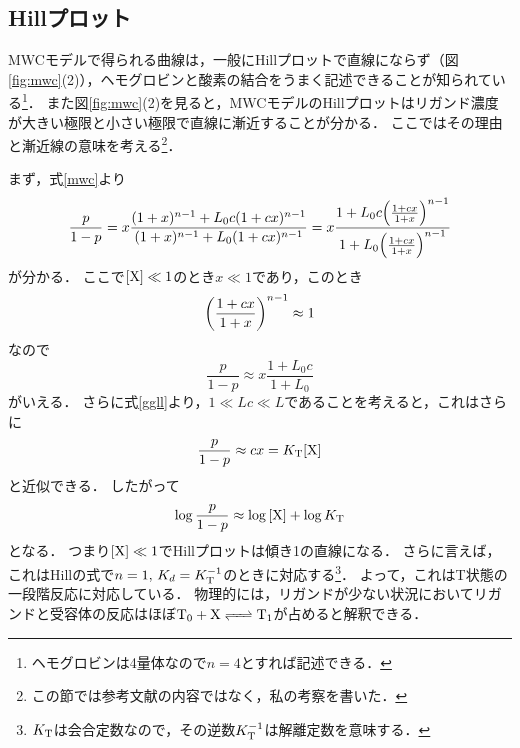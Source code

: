 \subsection{Hillプロット}
MWCモデルで得られる曲線は，一般にHillプロットで直線にならず（図\ref{fig:mwc}(2)），ヘモグロビンと酸素の結合をうまく記述できることが知られている\footnote{ヘモグロビンは4量体なので$n=4$とすれば記述できる．}．
また図\ref{fig:mwc}(2)を見ると，MWCモデルのHillプロットはリガンド濃度が大きい極限と小さい極限で直線に漸近することが分かる．
ここではその理由と漸近線の意味を考える\footnote{この節では参考文献\cite{TBoC}の内容ではなく，私の考察を書いた．}．

まず，式\eqref{mwc}より
\begin{equation}
  \frac{p}{1-p} = x\frac{(1+x)^{n-1} + L_0 c(1+cx)^{n-1}}{(1+x)^{n-1} + L_0 (1+cx)^{n-1}} = x\frac{1+L_0c\qty(\frac{1+cx}{1+x})^{n-1}}{1+L_0\qty(\frac{1+cx}{1+x})^{n-1}}
\end{equation}
が分かる．
ここで$[\ce{X}] \ll 1$のとき$x \ll 1$であり，このとき
\begin{equation}
  \qty(\frac{1+cx}{1+x})^{n-1} \approx 1
\end{equation}
なので
\begin{equation}
  \frac{p}{1-p} \approx x\frac{1+L_0c}{1+L_0}
\end{equation}
がいえる．
さらに式\eqref{ggll}より，$1 \ll Lc  \ll L$であることを考えると，これはさらに
\begin{equation}
  \frac{p}{1-p} \approx cx = K_{\ce{T}}[\ce{X}] 
\end{equation}
と近似できる．
したがって
\begin{equation}
  \log{\frac{p}{1-p}} \approx  \log{[\ce{X}]} + \log{K_{\ce{T}}} \label{hill_t}
\end{equation}
となる．
つまり$[\ce{X}] \ll 1$でHillプロットは傾き1の直線になる．
さらに言えば，これはHillの式で$n=1,\,K_d=K_{\ce{T}}^{-1}$のときに対応する\footnote{$K_{\ce{T}}$は会合定数なので，その逆数$K_{\ce{T}}^{-1}$は解離定数を意味する．}．
よって，これはT状態の一段階反応に対応している．
物理的には，リガンドが少ない状況においてリガンドと受容体の反応はほぼ$\ce{T_0 + X <=> T_1}$が占めると解釈できる．

